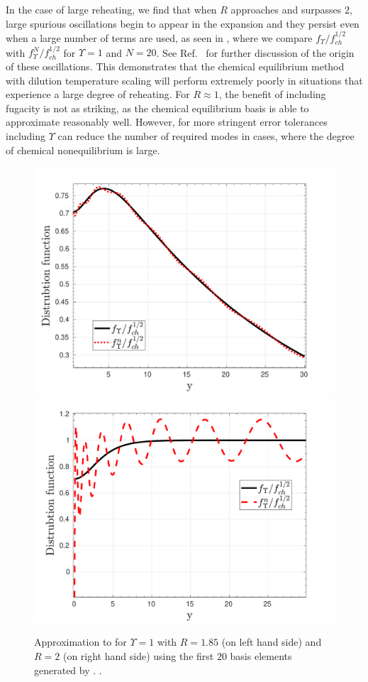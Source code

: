 In the case of large reheating, we find that when $R$ approaches and surpasses $2$, large spurious oscillations begin to appear in the expansion and they persist even when a large number of terms are used, as seen in   , 
where we compare $f_\Upsilon/f_{ch}^{1/2}$ with $f_{\Upsilon}^N/f_{ch}^{1/2}$ for $\Upsilon=1$ and $N=20$. See Ref.~\cite{Birrell:2014gea} for further discussion of the origin of these oscillations. This demonstrates that the chemical equilibrium method with dilution temperature scaling will  perform extremely poorly in situations that experience a large degree of reheating. For $R\approx 1$, the benefit of including fugacity is not as striking, as the chemical equilibrium basis is able to approximate  reasonably well.  However, for more stringent error tolerances including $\Upsilon$ can reduce the number of required modes in cases, where the degree of chemical nonequilibrium is large.
 
\begin{figure}
\centerline{\includegraphics[width=0.5\linewidth]{plots/free_stream_f0_approx_Ups_1_T_r_1_85_n_20.pdf}\hspace{-0.6cm}
\includegraphics[width=0.5\linewidth]{plots/free_stream_f0_approx_Ups_1_T_r_2_n_20.pdf}}
\caption{Approximation to  for $\Upsilon=1$ with $R=1.85$ (on left hand side) and $R=2$ (on right hand side)  using the first $20$ basis elements generated by . .}\label{fig:freeStreamf0approxUps1Tr185}
\end{figure}



